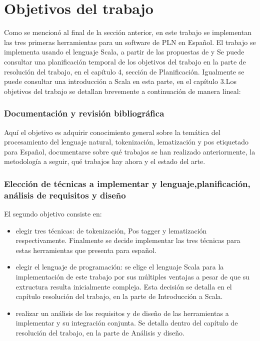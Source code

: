 
\chapter{Objetivos del trabajo}
Como se mencionó al final de la sección anterior, en este trabajo se implementan las tres primeras herramientas para un software de PLN en Español. El trabajo se implementa usando el lenguaje \textcolor{SchoolColor}{Scala}, a partir de las propuestas de \citet{smedt2012pattern} y
Se puede consultar una planificación temporal de los objetivos del trabajo en la parte de \textsf{resolución del trabajo}, en el capítulo 4, sección de Planificación. Igualmente se puede consultar una introducción a \textcolor{SchoolColor}{Scala} en esta parte, en el capítulo 3.\newline Los objetivos del trabajo se detallan brevemente a continuación de manera lineal: 
\subsection*{Documentación y revisión bibliográfica}
Aquí el objetivo es adquirir conocimiento general sobre la temática del procesamiento del lenguaje natural, tokenización, lematización y pos etiquetado para Español, documentarse sobre qué trabajos se han realizado anteriormente, la metodología a seguir, qué trabajos hay ahora y el estado del arte. 
\subsection*{Elección de técnicas a implementar y lenguaje,planificación, análisis de requisitos y diseño}
El segundo objetivo consiste en:
\begin{itemize}
\item elegir tres técnicas: de tokenización, Pos tagger y lematización respectivamente. Finalmente se decide implementar las tres técnicas para estas herramientas que presenta \citet{smedt2012pattern} para español.
\item elegir el lenguaje de programación: se elige el lenguaje Scala para la implementación de este trabajo por sus múltiples ventajas a pesar de que su extructura resulta inicialmente compleja. Esta decisión se detalla en el capítulo resolución del trabajo, en la parte de Introducción a Scala.
\item realizar un análisis de los requisitos y de diseño de las herramientas a implementar y su integración conjunta. Se detalla dentro del capítulo de resolución del trabajo, en la parte de Análisis y diseño.
\end{itemize}


